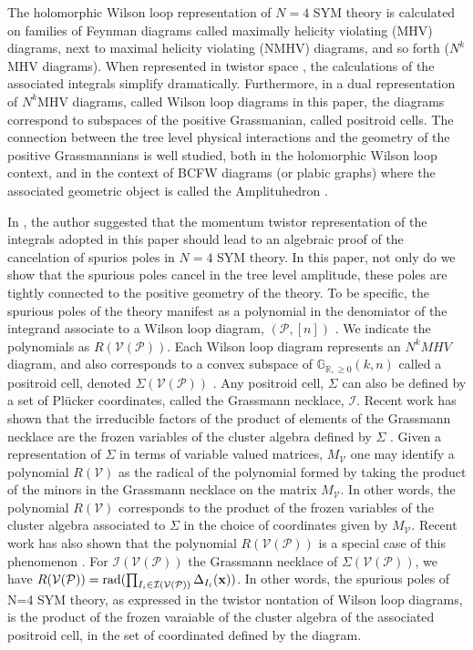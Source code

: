 \documentclass[11pt]{article}
\newcommand{\R}{\mathbb{R}}
\newcommand{\Gr}{\mathbb{G}_{\R, \geq 0}}
\newcommand{\cP}{\mathcal{P}}
\newcommand{\cV}{\mathcal{V}}
\newcommand{\VP}{\cV(\cP)}
\newcommand{\cI}{\mathcal{I}}
\theoremstyle{remark}
\theoremstyle{definition}
\begin{document}
The holomorphic Wilson loop representation of $N=4$ SYM theory is calculated on families of Feynman diagrams called maximally helicity violating (MHV) diagrams, next to maximal helicity violating (NMHV) diagrams, and so forth ($N^k$MHV diagrams). When represented in twistor space \cite{Adamo:2011pr,Boels:2007qn, Bullimore:2010pj}, the calculations of the associated integrals simplify dramatically. Furthermore, in a dual representation of $N^k$MHV diagrams, called Wilson loop diagrams in this paper, the diagrams correspond to subspaces of the positive Grassmanian, called positroid cells. The connection between the tree level physical interactions and the geometry of the positive Grassmannians is well studied, both in the holomorphic Wilson loop context, and in the context of BCFW diagrams (or plabic graphs) where the associated geometric object is called the Amplituhedron \cite[Chapter 2]{GrassmannAmplitudebook}. 

In \cite{hodges:2013eliminating}, the author suggested that the momentum twistor representation of the integrals adopted in this paper should lead to an algebraic proof of the cancelation of spurios poles in  $N=4$ SYM theory. In this paper, not only do we show that the spurious poles cancel in the tree level amplitude, these poles are tightly connected to the positive geometry of the theory. To be specific, the spurious poles of the theory manifest as a polynomial in the denomiator of the integrand associate to a Wilson loop diagram, $(\cP, [n])$ \cite{Adamo:2012xe, HeslopStewart, hodges:2013eliminating}. We indicate the polynomials as $R(\VP)$. Each Wilson loop diagram represents an $N^kMHV$ diagram, and also corresponds to a convex subspace of $\Gr(k,n)$ called a positroid cell, denoted $\Sigma(\VP)$ \cite{Wilsonloop, generalcombinatoricsI}. Any positroid cell, $\Sigma$ can also be defined by a set of Pl\"{u}cker coordinates, called the Grassmann necklace, $\cI$\cite[Section 16]{Postnikov}. Recent work has shown that the irreducible factors of the product of elements of the Grassmann necklace are the frozen variables of the cluster algebra defined by $\Sigma$ \cite{galashinlam19, SS-BW}. Given a representation of $\Sigma$ in terms of variable valued matrices, $M_\cV$ one may identify a polynomial $R(\cV)$ as the radical of the polynomial formed by taking the product of the minors in the Grassmann necklace on the matrix $M_\cV$. In other words, the polynomial $R(\cV)$ corresponds to the product of the frozen variables of the cluster algebra associated to $\Sigma$ in the choice of coordinates given by $M_\cV$. Recent work has also shown that the polynomial $R(\VP)$ is a special case of this phenomenon \cite{generalcombinatoricsI}. For $\cI(\VP)$ the Grassmann necklace of $\Sigma(\VP)$, we have $R(\VP) = \textrm{rad}(\prod_{I_i \in \cI(\VP)} \Delta_{I_i}(\bf{x}))$. In other words, the spurious poles of N=4 SYM theory, as expressed in the twistor nontation of Wilson loop diagrams, is the product of the frozen varaiable of the cluster algebra of the associated positroid cell, in the set of coordinated defined by the diagram.
\end{document}
